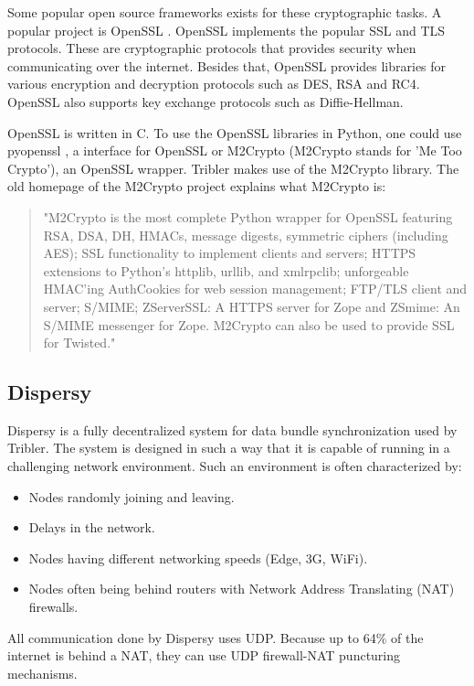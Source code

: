 		Some popular open source frameworks exists for these cryptographic tasks. A popular project is OpenSSL \cite{openssl}. OpenSSL implements the popular SSL and TLS protocols. These are cryptographic protocols that provides security when communicating over the internet. Besides that, OpenSSL provides libraries for various encryption and decryption protocols such as DES, RSA and RC4. OpenSSL also supports key exchange protocols such as Diffie-Hellman.
		
		OpenSSL is written in C. To use the OpenSSL libraries in Python, one could use pyopenssl \cite{pyopensslgithub}, a interface for OpenSSL or M2Crypto \cite{m2cryptogithub} (M2Crypto stands for 'Me Too Crypto'), an OpenSSL wrapper. Tribler makes use of the M2Crypto library. The old homepage of the M2Crypto project explains what M2Crypto is:
		
		\begin{quote}
		"M2Crypto is the most complete Python wrapper for OpenSSL featuring RSA, DSA, DH, HMACs, message digests, symmetric ciphers (including AES); SSL functionality to implement clients and servers; HTTPS extensions to Python's httplib, urllib, and xmlrpclib; unforgeable HMAC'ing AuthCookies for web session management; FTP/TLS client and server; S/MIME; ZServerSSL: A HTTPS server for Zope and ZSmime: An S/MIME messenger for Zope. M2Crypto can also be used to provide SSL for Twisted." \cite{m2crypto}
		\end{quote}
		
	\subsection{Dispersy}
		Dispersy \cite{zeilemaker2013dispersy} is a fully decentralized system for data bundle synchronization used by Tribler. The system is designed in such a way that it is capable of running in a challenging network environment. Such an environment is often characterized by:
		\begin{itemize}
			\item Nodes randomly joining and leaving.
			\item Delays in the network.
			\item Nodes having different networking speeds (Edge, 3G, WiFi).
			\item Nodes often being behind routers with Network Address Translating (NAT) firewalls.
		\end{itemize}
		
		All communication done by Dispersy uses UDP. Because up to 64\% of the internet is behind a NAT, they can use UDP firewall-NAT puncturing mechanisms\cite{zeilemaker2013dispersy}.
		
